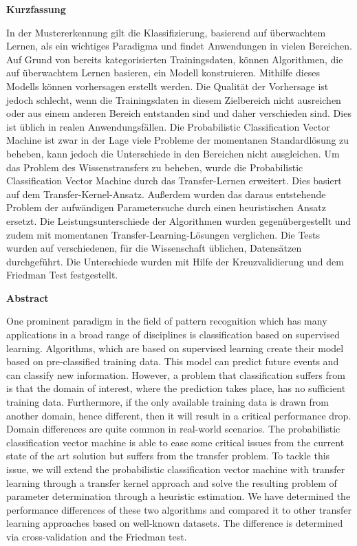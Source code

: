 \thispagestyle{kf}
\begin{center}
 	\Large\textbf{Kurzfassung}\\
\end{center}
In der Mustererkennung gilt die Klassifizierung, basierend auf überwachtem Lernen, als ein wichtiges Paradigma und findet Anwendungen in vielen Bereichen. Auf Grund von bereits kategorisierten Trainingsdaten, können Algorithmen, die auf überwachtem Lernen basieren, ein Modell konstruieren. Mithilfe dieses Modells können vorhersagen erstellt werden. Die Qualität der Vorhersage ist jedoch schlecht, wenn die Trainingsdaten in diesem Zielbereich nicht ausreichen oder aus einem anderen Bereich entstanden sind und daher verschieden sind. Dies ist üblich in realen Anwendungsfällen. Die Probabilistic Classification Vector Machine ist zwar in der Lage viele Probleme der momentanen Standardlösung zu beheben, kann jedoch die Unterschiede in den Bereichen nicht ausgleichen. Um das Problem des Wissenstransfers zu beheben, wurde die Probabilistic Classification Vector Machine durch das Transfer-Lernen erweitert. Dies basiert auf dem Transfer-Kernel-Ansatz. Außerdem wurden das daraus entstehende Problem der aufwändigen Parametersuche durch einen heuristischen Ansatz ersetzt. Die Leistungsunterschiede der Algorithmen wurden gegenübergestellt und zudem mit momentanen Transfer-Learning-Lösungen verglichen. Die Tests wurden auf verschiedenen, für die Wissenschaft üblichen, Datensätzen durchgeführt. Die Unterschiede wurden mit Hilfe der Kreuzvalidierung und dem Friedman Test festgestellt.
\newpage


\thispagestyle{abs}
\begin{center}
	\Large\textbf{Abstract}\\
\end{center}
One prominent paradigm in the field of pattern recognition which has many applications in a broad range of disciplines is classification based on supervised learning. 
Algorithms, which are based on supervised learning create their model based on pre-classified training data.
This model can predict future events and can classify new information.
However, a problem that classification suffers from is that the domain of interest, where the prediction takes place, has no sufficient training data. 
Furthermore, if the only available training data is drawn from another domain, hence different, then it will result in a critical performance drop.
Domain differences are quite common in real-world scenarios.
The probabilistic classification vector machine is able to ease some critical issues from the current state of the art solution but suffers from the transfer problem.
To tackle this issue, we will extend the probabilistic classification vector machine with transfer learning through a transfer kernel approach and solve the resulting problem of parameter determination through a heuristic estimation. 
We have determined the performance differences of these two algorithms and compared it to other transfer learning approaches based on well-known datasets.
The difference is determined via cross-validation and the Friedman test.
